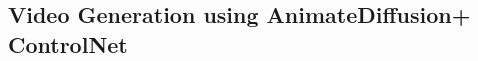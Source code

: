 \documentclass[final-report]{report-template}
\begin{document}
\subsection{Video Generation using AnimateDiffusion+ ControlNet}



\end{document}
